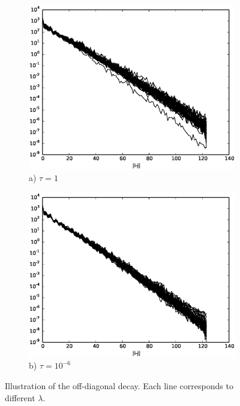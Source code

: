 \begin{figure}[h]
\centering
\begin{subfigure}{.5\linewidth}
  \centering
  \includegraphics[width=1\linewidth]{./Figures/HessianDecayN30Tau1.eps}
  \caption{a) $\tau = 1$}
  \label{f:HessianDecayN30Tau1}
\end{subfigure}%
\begin{subfigure}{.5\linewidth}
  \centering
  \includegraphics[width=1\linewidth]{./Figures/HessianDecayN30Tau10minus6.eps}
  \caption{b) $\tau = 10^{-6}$}
  \label{f:HessianDecayN30Tau10minus6}
\end{subfigure}
\caption{Illustration of the off-diagonal decay. Each line corresponds to different $\lambda$.}
\label{fig:test}
\end{figure}

